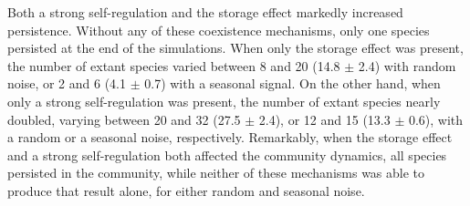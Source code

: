\documentclass[smallcondensed,referee]{svjour3}       %
\begin{document}
Both a strong self-regulation and the storage effect markedly increased
persistence. Without any of these coexistence mechanisms, only one
species persisted at the end of the simulations. When only the storage
effect was present, the number of extant species varied between 8
and 20 (14.8 $\pm$ 2.4) with random noise, or 2 and 6 (4.1 $\pm$
0.7) with a seasonal signal. On the other hand, when only a strong
self-regulation was present, the number of extant species nearly doubled,
varying between 20 and 32 (27.5 $\pm$ 2.4), or 12 and 15 (13.3 $\pm$
0.6), with a random or a seasonal noise, respectively. Remarkably,
when the storage effect and a strong self-regulation both affected
the community dynamics, all species persisted in the community, while
neither of these mechanisms was able to produce that result alone,
for either random and seasonal noise.
\end{document}
